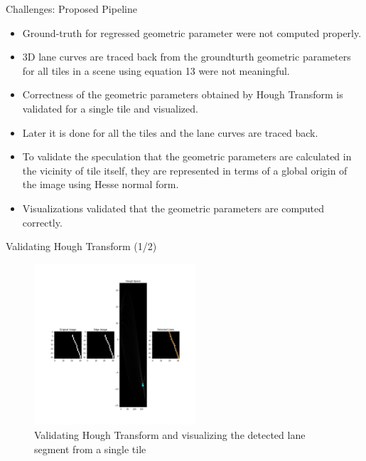 \documentclass[aspectratio=169]{beamer}
\begin{document}
\begin{frame}{Challenges: Proposed Pipeline}
    \begin{itemize}
        \item Ground-truth for regressed geometric parameter were not computed properly.
        \item 3D lane curves are traced back from the groundturth geometric parameters for all tiles in a scene using equation 13 were not meaningful.
        \item Correctness of the geometric parameters obtained by Hough Transform is validated for a single tile and visualized.
        \item Later it is done for all the tiles and the lane curves are traced back.
        \item To validate the speculation that the geometric parameters are calculated in the vicinity of tile itself, they are represented in terms of a global origin of the image using Hesse normal form.
        \item Visualizations validated that the geometric parameters are computed correctly.
    \end{itemize}
\end{frame}
\begin{frame}{Validating Hough Transform (1/2)}
    \begin{figure}[h]
      
        \centering
        \includegraphics[width=0.6\linewidth, height=6cm]{images/hough_validation.jpg} 
        \caption{Validating Hough Transform and visualizing the detected lane segment from a single tile}
        \end{figure}
\end{frame}
\end{document}
